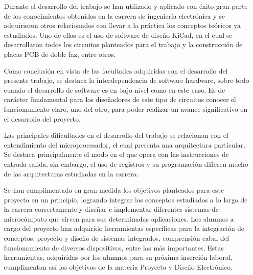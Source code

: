 Durante el desarrollo del trabajo se han utilizado y aplicado con éxito gran parte de los conocimientos obtenidos en la carrera de ingeniería electrónica y se adquirieron otros relacionados con llevar a la práctica los conceptos teóricos ya estudiados. Uno de ellos es el uso de software de diseño KiCad, en el cual se desarrollaron todos los circuitos planteados para el trabajo y la construcción de placas PCB de doble faz, entre otros. 


Como conclusión en vista de las facultades adquiridas con el desarrollo del presente trabajo, se destaca la interdependencia de software-hardware, sobre todo cuando el desarrollo de software es en bajo nivel como en este caso. Es de carácter fundamental para los diseñadores de este tipo de circuitos conocer el funcionamiento claro, uno del otro, para poder realizar un avance significativo en el desarrollo del proyecto. 

Las principales dificultades en el desarrollo del trabajo se relacionan con el entendimiento del microprocesador, el cual presenta una arquitectura particular. Se destaca principalmente el modo en el que opera con las instrucciones de entrada-salida, sin embargo, el uso de registros y su programación difieren mucho de las arquitecturas estudiadas en la carrera. 

Se han cumplimentado en gran medida los objetivos planteados para este proyecto en un principio, logrando integrar los conceptos estudiados a lo largo de la carrera correctamente y diseñar e implementar diferentes sistemas de microcómputo que sirven para sus determinadas aplicaciones. Los alumnos a cargo del proyecto han adquirido herramientas específicas para la integración de conceptos, proyecto y diseño de sistemas integrados, comprensión cabal del funcionamiento de diversos dispositivos, entre las más importantes. Estas herramientas, adquiridas por los alumnos para su próxima inserción laboral, cumplimentan así los objetivos de la materia Proyecto y Diseño Electrónico. 